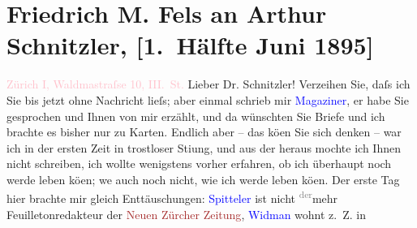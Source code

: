 

               \section[Friedrich M. Fels an Arthur Schnitzler, {[}1. Hälfte Juni 1895{]}]{ Friedrich M. Fels an Arthur Schnitzler, {[}1. Hälfte Juni
                    1895{]}}\nopagebreak{}\rehead{ }\normalsize\beginnumbering{} \toendnotes[C]{\smallbreak\pagebreak[2]} 
\toendnotes[C]{\smallbreak}\pstart
           \raggedleft{}{\pb}\textcolor{pink}{Zürich I, Waldma{\geminationn}straſse 10, III. St.}{}\ledrightnote{\textcolor{pink}{Waldmannstraße}}\pend
           \pstart{}Lieber Dr. Schnitzler!\pend\pstart
           Verzeihen Sie, daſs ich Sie bis jetzt ohne Nachricht lieſs; aber einmal schrieb
                    mir \textcolor{blue}{Magaziner}{}\ledrightnote{\textcolor{blue}{Viktor Adalbert Magaziner}}, er habe Sie gesprochen und
                    Ihnen von mir erzählt, und da{\geminationn} wünschten Sie Briefe
                    und \introOben{}ich\introOben{} brachte es bisher nur zu Karten. Endlich aber –
                    das kö{\geminationn}en Sie sich denken – war ich in der ersten
                    Zeit in trostloser Sti{\geminationm}ung, und aus der heraus
                    mochte ich Ihnen nicht schreiben, ich wollte wenigstens vorher erfahren, ob ich
                    überhaupt noch werde leben kö{\geminationn}en; we{\geminationn} auch noch nicht, wie ich werde leben kö{\geminationn}en. Der erste Tag hier brachte mir gleich
                    Enttäuschungen: \textcolor{blue}{Spitteler}{}\ledrightnote{\textcolor{blue}{Carl Spitteler}} ist nicht \substVorne{}\textsuperscript{\textcolor{gray}{der}}\substDazwischen{}mehr\substHinten{} Feuilletonredakteur der \textcolor{brown}{Neuen Zürcher
                        Zeitung}{}\ledrightnote{\textcolor{brown}{Neue Zürcher Zeitung}}, \textcolor{blue}{Widman}{}\ledrightnote{\textcolor{blue}{Joseph Victor Widmann}} wohnt z. Z. in
